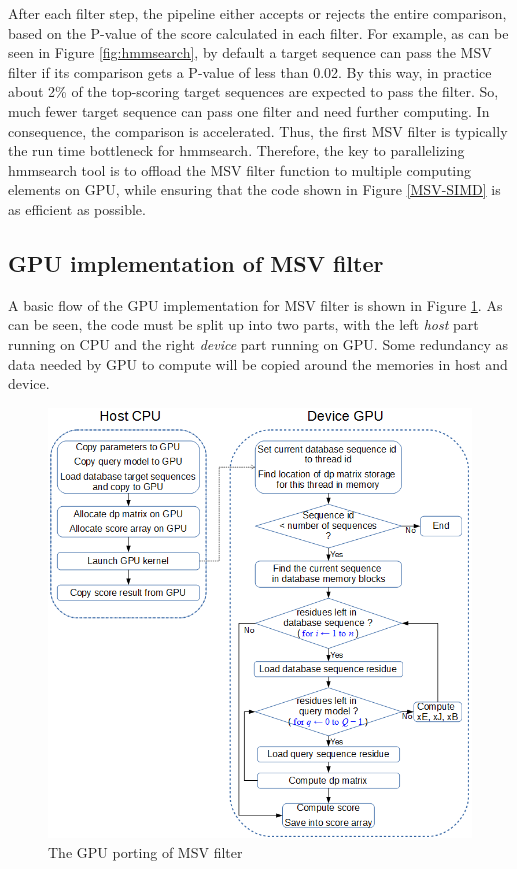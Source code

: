 \label{hmmsearch}
After each filter step, the pipeline either accepts or rejects the entire comparison, based on the P-value of the score calculated in each filter. For example, as can be seen in Figure \ref{fig:hmmsearch}, by default a target sequence can pass the MSV filter if its comparison gets a P-value of less than 0.02. By this way, in practice about 2\% of the top-scoring target sequences are expected to pass the filter. So, much fewer target sequence can pass one filter and need further computing. In consequence, the comparison is accelerated. Thus, the first MSV filter is typically the run time bottleneck for hmmsearch. Therefore, the key to parallelizing hmmsearch tool is to offload the MSV filter function to multiple computing elements on GPU, while ensuring that the code shown in Figure \ref{MSV-SIMD} is as efficient as possible.

\subsection{GPU implementation of MSV filter}

A basic flow of the GPU implementation for MSV filter is shown in Figure \ref{fig:gpuMSV}. As can be seen, the code must be split up into two parts, with the left \emph{host} part running on CPU and the right \emph{device} part running on GPU. Some redundancy as data needed by GPU to compute will be copied around the memories in host and device.

\begin{figure}[!htb]
 \centering
 \includegraphics[totalheight=0.6\textheight]{Figures/gpuMSV.png}
 \caption{\selectfont The GPU porting of MSV filter}
 \label{fig:gpuMSV}
\end{figure}

